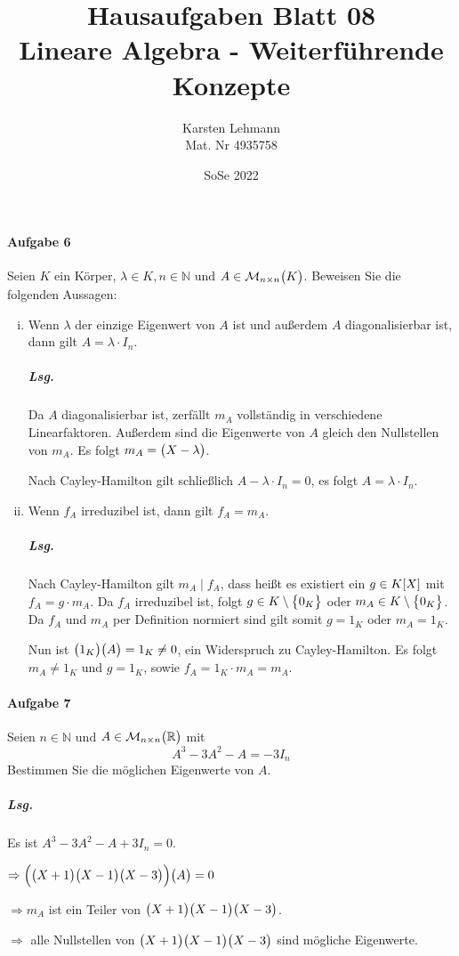 \documentclass{scrreprt}
\author{Karsten Lehmann\\Mat. Nr 4935758}
\date{SoSe 2022}
\title{Hausaufgaben Blatt 08\\Lineare Algebra - Weiterführende Konzepte}
\begin{document}
\paragraph{Aufgabe 6} Seien $K$ ein Körper, $\lambda \in K, n \in \mathbb{N}$ und
$A \in \mathcal{M}_{n \times n}\qty\big(K)$.
Beweisen Sie die folgenden Aussagen:
\begin{enumerate}[(i)]
\item Wenn $\lambda$ der einzige Eigenwert von $A$ ist und außerdem $A$
  diagonalisierbar ist, dann gilt $A = \lambda \cdot I_n$.

  \subparagraph{Lsg.} Da $A$ diagonalisierbar ist, zerfällt $m_A$ vollständig in
  verschiedene Linearfaktoren.
  Außerdem sind die Eigenwerte von $A$ gleich den Nullstellen von $m_A$.
  Es folgt $m_A = \qty\big(X - \lambda)$.

  Nach Cayley-Hamilton gilt schließlich $A - \lambda \cdot I_n = 0$, es folgt
  $A = \lambda \cdot I_n$.

\item Wenn $f_A$ irreduzibel ist, dann gilt $f_A = m_A$.

  \subparagraph{Lsg.} Nach Cayley-Hamilton gilt $m_A \mid f_A$,
  dass heißt es existiert ein $g \in K\qty[X]$ mit
  $f_A = g \cdot m_A$.
  Da $f_A$ irreduzibel ist, folgt $g \in K \setminus \qty\big{0_K}$ oder
  $m_A \in K \setminus \qty\big{0_K}$.
  Da $f_A$ und $m_A$ per Definition normiert sind gilt somit $g = 1_K$ oder
  $m_A = 1_K$.

  Nun ist $\qty\big(1_K)\qty\big(A) = 1_K \ne 0$, ein Widerspruch zu
  Cayley-Hamilton.
  Es folgt $m_A \ne 1_K$ und $g = 1_K$, sowie $f_A = 1_K \cdot m_A = m_A$.
\end{enumerate}

\paragraph{Aufgabe 7} Seien $n \in \mathbb{N}$ und
$A \in \mathcal{M}_{n \times n}\qty\big(\mathbb{R})$ mit
\[
  A^3 - 3A^2 -A = -3I_n
\]
Bestimmen Sie die möglichen Eigenwerte von $A$.

\subparagraph{Lsg.} Es ist $A^3 - 3A^2 - A + 3I_n = 0$.

$\Rightarrow \qty\Big(
  \qty\big(X + 1)\qty\big(X - 1)\qty\big(X - 3)
)\qty\big(A) = 0$

$\Rightarrow m_A$ ist ein Teiler von
$\qty\big(X + 1)\qty\big(X - 1)\qty\big(X - 3)$.

$\Rightarrow$ alle Nullstellen von
$\qty\big(X + 1)\qty\big(X - 1)\qty\big(X - 3)$ sind mögliche Eigenwerte.
\end{document}
